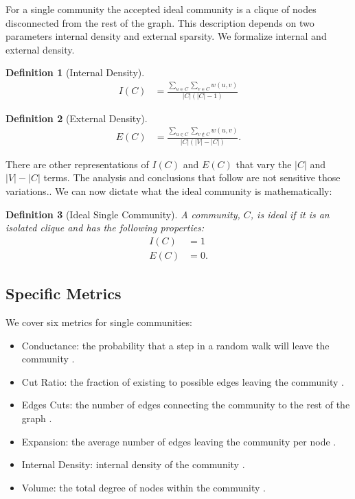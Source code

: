 \documentclass[conference]{IEEEtran}
\newtheorem{definition}{Definition}
\begin{document}
For a single community the accepted ideal community is a clique of nodes disconnected from the rest of the graph.  This description depends on two parameters internal density and external sparsity.  We formalize internal and external density.
\begin{definition}[Internal Density]
  \begin{align*}
   I(C) &=  \frac{\sum_{u \in C}\sum_{v \in C} w(u,v)}{|C|(|C| - 1)} 
\end{align*}
\end{definition}
\begin{definition}[External Density]
\begin{align*}
  E(C) &=\frac{\sum_{u \in C}\sum_{v \notin C} w(u,v)}{|C|(|V| - |C|)}.
  \end{align*}
\end{definition}
There are other representations of $I(C)$ and $E(C)$ that vary the $|C|$ and $|V| - |C|$ terms.  The analysis and conclusions that follow are not sensitive those variations..  We can now dictate what the ideal community is mathematically:
\begin{definition}[Ideal Single Community]
 A community, $C$, is ideal if it is an isolated clique and has the following properties:
  \begin{align*}
   I(C) &= 1 \\
   E(C) &= 0.
  \end{align*}
\end{definition}


\subsection{Specific Metrics}

We cover six metrics for single communities:
\begin{itemize}[]
 \item {\sc Conductance}: the probability that a step in a random walk will leave the community \cite{conductance}.
 \item {\sc Cut Ratio}: the fraction of existing to possible edges leaving the community \cite{cut_ratio}.
 \item {\sc Edges Cuts}: the number of edges connecting the community to the rest of the graph \cite{edges_cut}.
  \item {\sc Expansion}: the average number of edges leaving the community per node \cite{expansion}.
  \item {\sc Internal Density}: internal density of the community \cite{i_density}.
  \item {\sc Volume}: the total degree of nodes within the community \cite{volume}.
\end{itemize}
\end{document}
